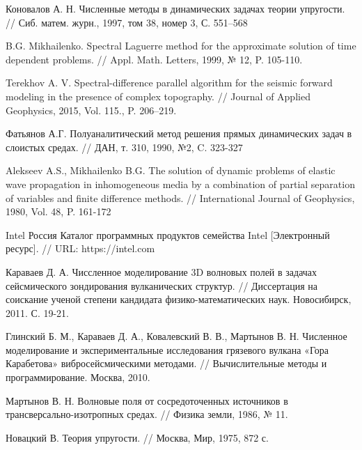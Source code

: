 \begingroup 
\renewcommand{\section}[2]{\anonsection{Библиографический список}}
\begin{thebibliography}{00}

	Коновалов А. Н.
	Численные методы в динамических задачах теории упругости. //
	Сиб. матем. журн., 1997, том 38, номер 3, С. 551–568

	B.G. Mikhailenko.
	Spectral Laguerre method for the approximate solution of time dependent problems. //
	Appl. Math. Letters, 1999, № 12, P. 105-110.

	Terekhov A. V. Spectral-difference parallel algorithm for the seismic forward modeling in the presence of complex topography. //
	Journal of Applied Geophysics, 2015, Vol. 115., P. 206–219.

	Фатьянов А.Г.
	Полуаналитический метод решения прямых динамических задач в слоистых средах. //
	ДАН, т. 310, 1990, №2, C. 323-327 

	Alekseev A.S., Mikhailenko B.G.
	The solution of dynamic problems of elastic wave propagation in inhomogeneous media by a combination of partial separation of variables and finite difference methods. //
	International Journal of Geophysics, 1980, Vol. 48, P. 161-­172

	Intel Россия
    Каталог программных продуктов семейства Intel [Электронный ресурс]. //
    URL: https://intel.com

    Караваев Д. А.
    Чиссленное моделирование 3D волновых полей в задачах сейсмического зондирования вулканических структур. //
    Диссертация на соискание ученой степени кандидата физико-математических наук. Новосибирск, 2011. С. 19-21.

    Глинский Б. М., Караваев Д. А., Ковалевский В. В., Мартынов В. Н.
    Численное моделирование и экспериментальные исследования грязевого вулкана «Гора Карабетова» вибросейсмическими методами. //
    Вычислительные методы и программирование. Москва, 2010.

    Мартынов В. Н.
    Волновые поля от сосредоточенных источников в трансверсально-изотропных средах. //
    Физика земли, 1986, № 11.

    Новацкий В.
    Теория упругости. //
    Москва, Мир, 1975, 872 с.


\end{thebibliography}
